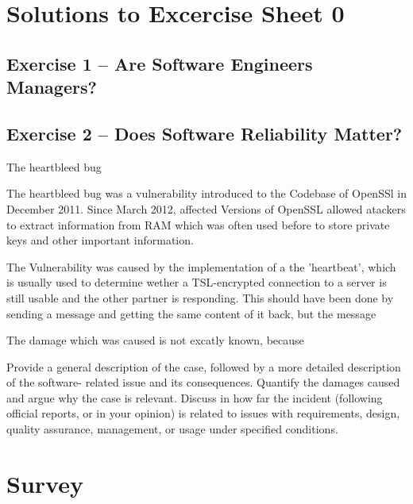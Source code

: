 \documentclass{scrartcl}
\begin{document}
\section*{Solutions to Excercise Sheet 0}

\subsection*{Exercise 1 – Are Software Engineers Managers?}

\subsection*{Exercise 2 – Does Software Reliability Matter?}

The heartbleed bug

The heartbleed bug was a vulnerability introduced to the Codebase of OpenSSl in December 2011. Since March 2012, affected Versions of OpenSSL allowed atackers to extract information from RAM which was often used before to store private keys and other important information.

The Vulnerability was caused by the implementation of a the 'heartbeat', which is usually used to determine wether a TSL-encrypted connection to a server is still usable and the other partner is responding. This should have been done by sending a message and getting the same content of it back, but the message 

The damage which was caused is not excatly known, because


Provide a general description of the case, followed by a more detailed description of the software-
related issue and its consequences.
 Quantify the damages caused and argue why the case is relevant.
Discuss in how far the incident (following official reports, or in your opinion) is related to issues with
requirements, design, quality assurance, management, or usage under specified conditions.

\section*{Survey}
\end{document}
